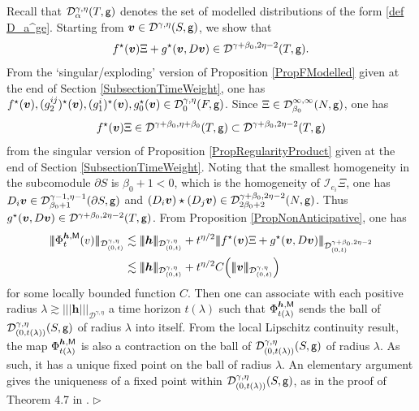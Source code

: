 \documentclass[10pt, reqno]{amsart}
\numberwithin{subsection}{section}
\numberwithin{subsubsection}{subsection}
\numberwithin{equation}{section} %
\newenvironment{Dem}[1][\unskip]{%
    \begin{list}{\hspace{1.15cm}{\sf \textbf{{\small Proof #1 --}}}}{%
        \setlength{\topsep}{0pt}%
        \setlength{\leftmargin}{0pt}%
        \setlength{\rightmargin}{0pt}%
        \setlength{\listparindent}{0pt}%
        \setlength{\itemindent}{0pt}%
        \setlength{\parsep}{0pt}%
        \addtolength{\leftmargin}{0pt}%
        \addtolength{\rightmargin}{0pt}%
    } \item }{\hfill $\rhd$\end{list}\smallskip}
\theoremstyle{mystyle}
\theoremstyle{mystyle2}
\theoremstyle{mystyle3}
\newcommand{\trino}[1]{|\!|\!|#1|\!|\!|}
\newcommand{\bsh}{\boldsymbol{h}}
\newcommand{\bsv}{\boldsymbol{v}}
\newcommand{\mcD}{\mathcal{D}}
\newcommand{\mcI}{\mathcal{I}}
\begin{document}
\begin{Dem}
Recall that $\mcD_\alpha^{\gamma,\eta}(T,{\sf g})$ denotes the set of modelled distributions of the form \eqref{def D_a^ge}.
Starting from $\bsv\in\mcD^{\gamma,\eta}(S,{\sf g})$, we show that
$$
f^\star(\bsv)\Xi + g^\star(\bsv, D\bsv )\in\mcD^{\gamma+\beta_0,2\eta-2}(T,{\sf g}).
$$
From the `singular/exploding' version of Proposition \ref{PropFModelled} given at the end of Section \ref{SubsectionTimeWeight}, one has $f^\star(\bsv),(g_2^{ij})^\star(\bsv),(g_1^i)^\star(\bsv),g_0^\star(\bsv)\in\mcD_0^{\gamma,\eta}(F,{\sf g})$. Since $\Xi\in\mcD_{\beta_0}^{\infty,\infty}(N,{\sf g})$, one has 
$$
f^\star(\bsv)\Xi\in \mcD^{\gamma+\beta_0,\eta+\beta_0}(T,{\sf g})\subset \mcD^{\gamma+\beta_0,2\eta-2}(T,{\sf g})
$$ 
from the singular version of Proposition \ref{PropRegularityProduct} given at the end of Section \ref{SubsectionTimeWeight}. Noting that the smallest homogeneity in the subcomodule $\partial S$ 
is $\beta_0+1<0$, which is the homogeneity of $\mcI_{e_i} \Xi$, one has $ D_i\bsv \in\mcD_{\beta_0+1}^{\gamma-1,\eta-1}(\partial S,{\sf g})$ 
and $( D_i\bsv )\star(D_j\bsv)\in\mcD_{2\beta_0+2}^{\gamma+\beta_0,2\eta-2}(N,{\sf g})$. Thus $g^\star(\bsv, D\bsv )\in\mcD^{\gamma+\beta_0,2\eta-2}(T,{\sf g})$. From Proposition \ref{PropNonAnticipative}, one has
\begin{align*}
\trino{\Phi_t^{\bsh,\sf M}(v)}_{\mcD_{(0,t)}^{\gamma,\eta}}
&\lesssim \trino{\bsh}_{\mcD_{(0,t)}^{\gamma,\eta}}+t^{\eta/2}\trino{f^\star(\bsv)\Xi + g^\star(\bsv, D\bsv )}_{\mcD_{(0,t)}^{\gamma+\beta_0,2\eta-2}}   \\
&\lesssim \trino{\bsh}_{\mcD_{(0,t)}^{\gamma,\eta}}+t^{\eta/2}C\Big(\trino{\bsv}_{\mcD_{(0,t)}^{\gamma,\eta}}\Big)
\end{align*}
for some locally bounded function $C$. Then one can associate with each positive radius $\lambda\gtrsim\trino{\bsh}_{\mcD^{\gamma,\eta}}$ a time horizon $t(\lambda)$ such that $\Phi_{t(\lambda)}^{\bsh,\sf M}$ sends the ball of $\mcD_{(0,t(\lambda))}^{\gamma,\eta}(S,{\sf g})$ of radius $\lambda$ into itself. From the local Lipschitz continuity result, the map $\Phi_{t(\lambda)}^{\bsh,\sf M}$ is also a contraction on the ball of $\mcD_{(0,t(\lambda))}^{\gamma,\eta}(S,{\sf g})$ of radius $\lambda$. As such, it has a unique fixed point on the ball of radius $\lambda$. An elementary argument gives the uniqueness of a fixed point within $\mcD_{(0,t(\lambda))}^{\gamma,\eta}(S,{\sf g})$, as in the proof of Theorem 4.7 in \cite{HairerKPZ}.
\end{Dem}
\end{document}
